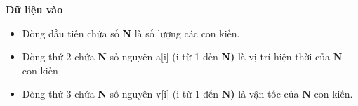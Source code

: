 \textbf{Dữ liệu vào }
\begin{itemize}
	\item Dòng đầu tiên chứa số \textbf{ N } là số lượng các con kiến.
	\item Dòng thứ 2 chứa \textbf{ N } số nguyên a[i] (i từ 1 đến \textbf{ N) } là vị trí hiện thời của \textbf{ N } con kiến
	\item Dòng thứ 3 chứa \textbf{ N } số nguyên v[i] (i từ 1 đến \textbf{ N) } là vận tốc của \textbf{ N } con kiến.
\end{itemize}